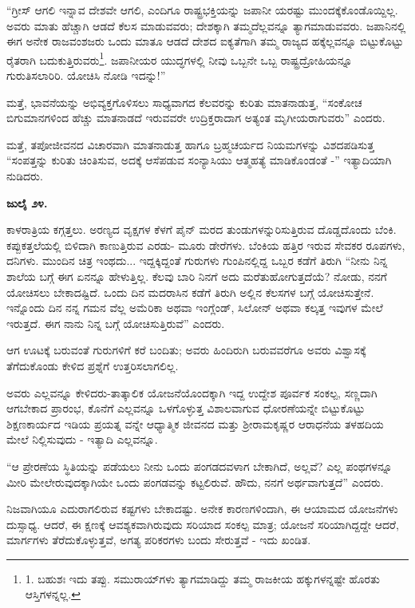 “ಗ್ರೀಸ್ ಆಗಲಿ ಇನ್ನಾವ ದೇಶವೇ ಆಗಲಿ, ಎಂದಿಗೂ ರಾಷ್ಟ್ರಭಕ್ತಿಯನ್ನು ಜಪಾನೀ ಯರಷ್ಟು ಮುಂದಕ್ಕೆಕೊಂಡೊಯ್ದಿಲ್ಲ. ಅವರು ಮಾತು ಹೆಚ್ಚಾಗಿ ಆಡದೆ ಕೆಲಸ ಮಾಡುವವರು; ದೇಶಕ್ಕಾಗಿ ತಮ್ಮದೆಲ್ಲವನ್ನೂ ತ್ಯಾಗಮಾಡುವವರು. ಜಪಾನಿನಲ್ಲಿ ಈಗ ಅನೇಕ ರಾಜವಂಶಜರು ಒಂದು ಮಾತೂ ಆಡದೆ ದೇಶದ ಐಕ್ಯತೆಗಾಗಿ ತಮ್ಮ ರಾಜ್ಯದ ಹಕ್ಕೆಲ್ಲವನ್ನೂ ಬಿಟ್ಟುಕೊಟ್ಟು ರೈತರಾಗಿ ಬದುಕುತ್ತಿರುವರು\footnote{1. ಬಹುಶಃ ಇದು ತಪ್ಪು. ಸಮುರಾಯ್​ಗಳು ತ್ಯಾಗಮಾಡಿದ್ದು ತಮ್ಮ ರಾಜಕೀಯ ಹಕ್ಕುಗಳನ್ನಷ್ಟೇ ಹೊರತು ಆಸ್ತಿಗಳನ್ನಲ್ಲ.}. ಜಪಾನೀಯರ ಯುದ್ಧಗಳಲ್ಲಿ ನೀವು ಒಬ್ಬನೇ ಒಬ್ಬ ರಾಷ್ಟ್ರದ್ರೋಹಿಯನ್ನೂ ಗುರುತಿಸಲಾರಿರಿ. ಯೋಚಿಸಿ ನೋಡಿ ಇದನ್ನು!”

ಮತ್ತೆ, ಭಾವನೆಯನ್ನು ಅಭಿವ್ಯಕ್ತಗೊಳಿಸಲು ಸಾಧ್ಯವಾಗದ ಕೆಲವರನ್ನು ಕುರಿತು ಮಾತನಾಡುತ್ತ, “ಸಂಕೋಚ ಬಿಗುಮಾನಗಳಿಂದ ಹೆಚ್ಚು ಮಾತನಾಡದೆ ಇರುವವರೇ ಉದ್ರಿಕ್ತರಾದಾಗ ಅತ್ಯಂತ ಮೃಗೀಯರಾಗುವರು” ಎಂದರು.

ಮತ್ತೆ, ತಪೋಜೀವನದ ವಿಚಾರವಾಗಿ ಮಾತನಾಡುತ್ತ ಹಾಗೂ ಬ್ರಹ್ಮಚರ್ಯದ ನಿಯಮಗಳನ್ನು ವಿಶದಪಡಿಸುತ್ತ “ಸಂಪತ್ತನ್ನು ಕುರಿತು ಚಿಂತಿಸುವ, ಅದಕ್ಕೆ ಆಸೆಪಡುವ ಸಂನ್ಯಾಸಿಯು ಆತ್ಮಹತ್ಯೆ ಮಾಡಿಕೊಂಡಂತೆ -” ಇತ್ಯಾದಿಯಾಗಿ ನುಡಿದರು.

\textbf{ಜುಲೈ ೨೪.}

ಕಾಳರಾತ್ರಿಯ ಕಗ್ಗತ್ತಲು. ಅರಣ್ಯದ ವೃಕ್ಷಗಳ ಕೆಳಗೆ ಪೈನ್ ಮರದ ತುಂಡುಗಳನ್ನುರಿಸುತ್ತಿರುವ ದೊಡ್ಡದೊಂದು ಬೆಂಕಿ. ಕಪ್ಪುಕತ್ತಲೆಯಲ್ಲಿ ಬಿಳಿದಾಗಿ ಕಾಣುತ್ತಿರುವ ಎರಡು- ಮೂರು ಡೇರೆಗಳು. ಬೆಂಕಿಯ ಹತ್ತಿರ ಇರುವ ಸೇವಕರ ರೂಪಗಳು, ದನಿಗಳು. ಮುಂದಿನ ಚಿತ್ರ ಇಂಥದು... ಇದ್ದಕ್ಕಿದ್ದಂತೆ ಗುರುಗಳು ಗುಂಪಿನಲ್ಲಿದ್ದ ಒಬ್ಬರ ಕಡೆಗೆ ತಿರುಗಿ “ನೀನು ನಿನ್ನ ಶಾಲೆಯ ಬಗ್ಗೆ ಈಗ ಏನನ್ನೂ ಹೇಳುತ್ತಿಲ್ಲ. ಕೆಲವು ಬಾರಿ ನಿನಗೆ ಅದು ಮರೆತುಹೋಗುತ್ತದೆಯೆ? ನೋಡು, ನನಗೆ ಯೋಚಿಸಲು ಬೇಕಾದಷ್ಟಿದೆ. ಒಂದು ದಿನ ಮದರಾಸಿನ ಕಡೆಗೆ ತಿರುಗಿ ಅಲ್ಲಿನ ಕೆಲಸಗಳ ಬಗ್ಗೆ ಯೋಚಿಸುತ್ತೇನೆ. ಇನ್ನೊಂದು ದಿನ ನನ್ನ ಗಮನ ವೆಲ್ಲ ಅಮೆರಿಕಾ ಅಥವಾ ಇಂಗ್ಲೆಂಡ್, ಸಿಲೋನ್ ಅಥವಾ ಕಲ್ಕತ್ತ ಇವುಗಳ ಮೇಲೆ ಇರುತ್ತದೆ. ಈಗ ನಾನು ನಿನ್ನ ಬಗ್ಗೆ ಯೋಚಿಸುತ್ತಿರುವೆ” ಎಂದರು.

ಆಗ ಊಟಕ್ಕೆ ಬರುವಂತೆ ಗುರುಗಳಿಗೆ ಕರೆ ಬಂದಿತು; ಅವರು ಹಿಂದಿರುಗಿ ಬರುವವರೆಗೂ ಅವರು ವಿಶ್ವಾಸಕ್ಕೆ ತೆಗೆದುಕೊಂಡು ಕೇಳಿದ ಪ್ರಶ್ನೆಗೆ ಉತ್ತರಿಸಲಾಗಲಿಲ್ಲ.

ಅವರು ಎಲ್ಲವನ್ನೂ ಕೇಳಿದರು-ತಾತ್ಕಾಲಿಕ ಯೋಜನೆಯೊಂದಕ್ಕಾಗಿ ಇದ್ದ ಉದ್ದೇಶ ಪೂರ್ವಕ ಸಂಕಲ್ಪ, ಸಣ್ಣದಾಗಿ ಆಗಬೇಕಾದ ಪ್ರಾರಂಭ, ಕೊನೆಗೆ ಎಲ್ಲವನ್ನೂ ಒಳಗೊಳ್ಳುತ್ತ ವಿಶಾಲವಾಗುವ ಧೋರಣೆಯನ್ನೇ ಬಿಟ್ಟುಕೊಟ್ಟು ಶಿಕ್ಷಣಕಾರ್ಯದ ಇಡಿಯ ಪ್ರಯತ್ನ ವನ್ನೇ ಆಧ್ಯಾತ್ಮಿಕ ಜೀವನದ ಮತ್ತು ಶ‍್ರೀರಾಮಕೃಷ್ಣರ ಆರಾಧನೆಯ ತಳಹದಿಯ ಮೇಲೆ ನಿಲ್ಲಿಸುವುದು - ಇತ್ಯಾದಿ ಎಲ್ಲವನ್ನೂ.

“ಆ ಪ್ರೇರಣೆಯ ಸ್ಥಿತಿಯನ್ನು ಪಡೆಯಲು ನೀನು ಒಂದು ಪಂಗಡದವಳಾಗ ಬೇಕಾಗಿದೆ, ಅಲ್ಲವೆ? ಎಲ್ಲ ಪಂಥಗಳನ್ನೂ ಮೀರಿ ಮೇಲೇರುವುದಕ್ಕಾಗಿಯೇ ಒಂದು ಪಂಗಡವನ್ನು ಕಟ್ಟಲಿರುವೆ. ಹೌದು, ನನಗೆ ಅರ್ಥವಾಗುತ್ತದೆ” ಎಂದರು.

ನಿಜವಾಗಿಯೂ ಎದುರಾಗಲಿರುವ ಕಷ್ಟಗಳು ಬೇಕಾದಷ್ಟು. ಅನೇಕ ಕಾರಣಗಳಿಂದಾಗಿ, ಈ ಆಯಾಮದ ಯೋಜನೆಗಳು ದುಸ್ಸಾಧ್ಯ. ಆದರೆ, ಈ ಕ್ಷಣಕ್ಕೆ ಆವಶ್ಯಕವಾಗಿರುವುದು ಸರಿಯಾದ ಸಂಕಲ್ಪ ಮಾತ್ರ; ಯೋಜನೆ ಸರಿಯಾಗಿದ್ದದ್ದೇ ಆದರೆ, ಮಾರ್ಗಗಳು ತೆರೆದುಕೊಳ್ಳುತ್ತವೆ, ಅಗತ್ಯ ಪರಿಕರಗಳು ಬಂದು ಸೇರುತ್ತವೆ - ಇದು ಖಂಡಿತ.

